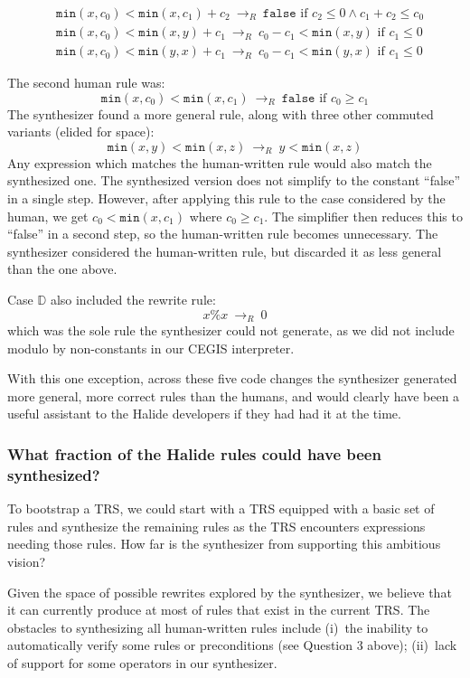\documentclass[acmsmall,review,anonymous]{acmart}\settopmatter{printfolios=true,printccs=false,printacmref=false}
\newcommand{\hmin}[0]{\texttt{min}}
\newcommand{\rewrites}[0]{\:\rightarrow_{R}\:}
\newcommand{\pred}[0]{\textrm{ if }}
\newcommand{\hfalse}[0]{\texttt{false}}
\begin{document}
\begin{align*}
& \hmin(x, c_0) < \hmin(x, c_1) + c_2 \rewrites  \hfalse \pred c_2 \leq 0 \wedge c_1 + c_2 \leq c_0 \\
& \hmin(x, c_0) < \hmin(x, y) + c_1 \rewrites c_0 - c_1 < \hmin(x, y) \pred c_1 \leq 0 \\
& \hmin(x, c_0) < \hmin(y, x) + c_1 \rewrites c_0 - c_1 < \hmin(y, x) \pred c_1 \leq 0
\end{align*}

The second human rule was:
\[
\hmin(x, c_0) < \hmin(x, c_1) \rewrites \hfalse \pred c_0 \geq c_1
\]
The synthesizer found a more general rule, along with three other commuted variants (elided for space):
\[
\hmin(x, y) < \hmin(x, z) \rewrites y < \hmin(x, z)
\]
Any expression which matches the human-written rule would also match the synthesized one. The synthesized version does not simplify to the constant “false” in a single step. However, after applying this rule to the case considered by the human, we get $c_0 < \hmin(x, c_1)$ where $c_0 \geq c_1$. The simplifier then reduces this to “false” in a second step, so the human-written rule becomes unnecessary. The synthesizer considered the human-written rule, but discarded it as less general than the one above.

Case $\mathbb{D}$ also included the rewrite rule: 
\[
x \% x \rewrites 0
\]
which was the sole rule the synthesizer could not generate, as we did not include modulo by non-constants in our CEGIS interpreter.

With this one exception, across these five code changes the synthesizer generated more general, more correct rules than the humans, and would clearly have been a useful assistant to the Halide developers if they had had it at the time.


\subsubsection{What fraction of the Halide rules could have been synthesized?}
\label{sub:replacementexperiment}
To bootstrap a TRS, we could start with a TRS equipped with a basic set of rules and synthesize the remaining rules as the TRS encounters expressions needing those rules.  How far is the synthesizer from supporting this ambitious vision?

Given the space of possible rewrites explored by the synthesizer, we believe that it can currently produce at most \PercentPossibleToSynth{} of rules that exist in the current TRS. The obstacles to synthesizing all human-written rules include (i)~the inability to automatically verify some rules or preconditions (see Question 3 above); (ii)~lack of support for some operators in our synthesizer. 
\end{document}
